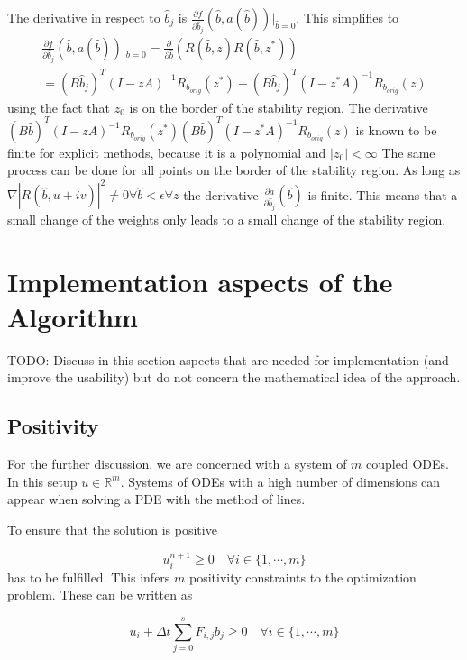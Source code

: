 \documentclass[a4paper]{scrartcl}
\numberwithin{equation}{section}
\theoremstyle{plain}
\theoremstyle{definition}
\numberwithin{theorem}{section}
\newcommand{\R}{\mathbb{R}}
\newcommand{\dt}{{\Delta t}}
\newcommand{\1}{\mathbbm{1}}
\begin{document}
The derivative in respect to $\hat{b}_j$ is 
$ \frac{\partial f}{\partial \hat{b}_j}(\hat{b},a(\hat{b})) \Big|_{\hat{b}=0}$.
This simplifies to 
\begin{multline}\label{eq:derivative_to_b}
 \frac{\partial f}{\partial \hat{b}_j}(\hat{b},a(\hat{b})) \Big|_{\hat{b}=0} = 
 \frac{\partial }{\partial \hat{b}}(R(\hat{b},z)R(\hat{b},z^*)) \\
 = (B\hat{b}_j)^T (I-zA)^{-1} R_{b_{orig}}(z^*) + (B\hat{b}_j)^T (I-z^*A)^{-1} R_{b_{orig}}(z)
\end{multline}
using the fact that $z_0$ is on the border of the stability region.
The derivative $(B\hat{b})^T (I-zA)^{-1} R_{b_{orig}}(z^*) (B\hat{b})^T (I-z^*A)^{-1} R_{b_{orig}}(z)$ is known to be finite for explicit methods, because it is a polynomial and $|z_0| < \infty$
The same process can be done for all points on the border of the stability region. 
As long as $\nabla|R(\hat{b},u+iv)|^2 \neq 0 \forall \hat{b} < \epsilon  \forall z$ the derivative $\frac{\partial a}{\partial \hat{b}_j} (\hat{b})$ is finite. This means that a small change of the weights only leads to a small change of the stability region.


\section{Implementation aspects of the Algorithm}\label{sec:imple}

TODO: Discuss in this section aspects that are needed for implementation (and improve the usability) but do not concern the mathematical idea of the approach.

\subsection{Positivity}


For the further discussion, we are concerned with a system of $m$ coupled ODEs. 
In this setup $u \in \R^m$.
Systems of ODEs with a high number of dimensions can appear when solving a PDE with the method of lines.

To ensure that the solution is positive 

\begin{equation}
 u_i^{n+1} \geq 0   \quad   \forall {i \in \{1, \cdots,m \}}  
\end{equation}
has to be fulfilled.
This infers $m$ positivity constraints to the optimization problem. These can be written as

\begin{equation}
u_i + \dt \sum_{j=0}^s F_{i,j}  b_j \geq 0 \quad \forall {i \in \{1, \cdots,m \}}  
\end{equation}
\end{document}
